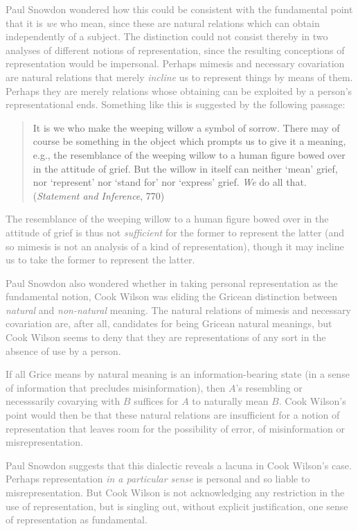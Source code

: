 \documentclass[11pt]{article}
\newcommand{\discuss}[2][gray]{\textcolor{#1}{#2}}
\begin{document}
\discuss{Paul Snowdon wondered how this could be consistent with the fundamental point that it is \emph{we} who mean, since these are natural relations which can obtain independently of a subject. The distinction could not consist thereby in two analyses of different notions of representation, since the resulting conceptions of representation would be impersonal. Perhaps mimesis and necessary covariation are natural relations that merely \emph{incline} us to represent things by means of them. Perhaps they are merely relations whose obtaining can be exploited by a person's representational ends. Something like this is suggested by the following passage:
\begin{quote}
	It is we who make the weeping willow a symbol of sorrow. There may of course be something in the object which prompts us to give it a meaning, e.g., the resemblance of the weeping willow to a human figure bowed over in the attitude of grief. But the willow in itself can neither `mean' grief, nor `represent' nor `stand for' nor `express' grief. \emph{We} do all that. (\emph{Statement and Inference}, 770)
\end{quote}}

\discuss{The resemblance of the weeping willow to a human figure bowed over in the attitude of grief is thus not \emph{sufficient} for the former to represent the latter (and so mimesis is not an analysis of a kind of representation), though it may incline us to take the former to represent the latter.}

\discuss{Paul Snowdon also wondered whether in taking personal representation as the fundamental notion, Cook Wilson was eliding the Gricean distinction between \emph{natural} and \emph{non-natural} meaning. The natural relations of mimesis and necessary covariation are, after all, candidates for being Gricean natural meanings, but Cook Wilson seems to deny that they are representations of any sort in the absence of use by a person.}

\discuss{If all Grice means by natural meaning is an information-bearing state (in a sense of information that precludes misinformation), then \( A \)'s resembling or necesssarily covarying with \( B \) suffices for \( A \) to naturally mean \( B \). Cook Wilson's point would then be that these natural relations are insufficient for a notion of representation that leaves room for the possibility of error, of misinformation or misrepresentation.}

\discuss{Paul Snowdon suggests that this dialectic reveals a lacuna in Cook Wilson's case. Perhaps representation \emph{in a particular sense} is personal and so liable to misrepresentation. But Cook Wilson is not acknowledging any restriction in the use of representation, but is singling out, without explicit justification, one sense of representation as fundamental.}
\end{document}
